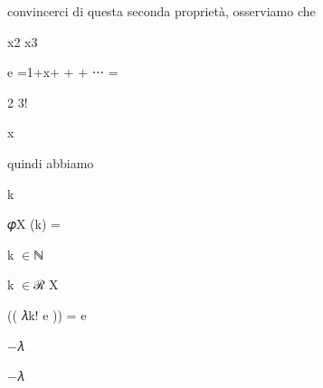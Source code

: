 \documentclass[a4paper,portrait,12pt]{article}
\begin{document}
\begin{flushleft}
convincerci di questa seconda propriet\`{a}, osserviamo che
\end{flushleft}


\begin{flushleft}
x2 x3
\end{flushleft}


\begin{flushleft}
e =1+x+ + + ⋅⋅⋅ =
\end{flushleft}


2 3!


\begin{flushleft}
x
\end{flushleft}





\begin{flushleft}
quindi abbiamo
\end{flushleft}





\begin{flushleft}
k
\end{flushleft}





\begin{flushleft}
𝜑X (k) =
\end{flushleft}


\begin{flushleft}
k $\in$ℕ
\end{flushleft}





\begin{flushleft}
k $\in$ℛ X
\end{flushleft}





\begin{flushleft}
(( 𝜆k! e )) = e
\end{flushleft}


\begin{flushleft}
$-$𝜆
\end{flushleft}





\begin{flushleft}
$-$𝜆
\end{flushleft}
\end{document}
